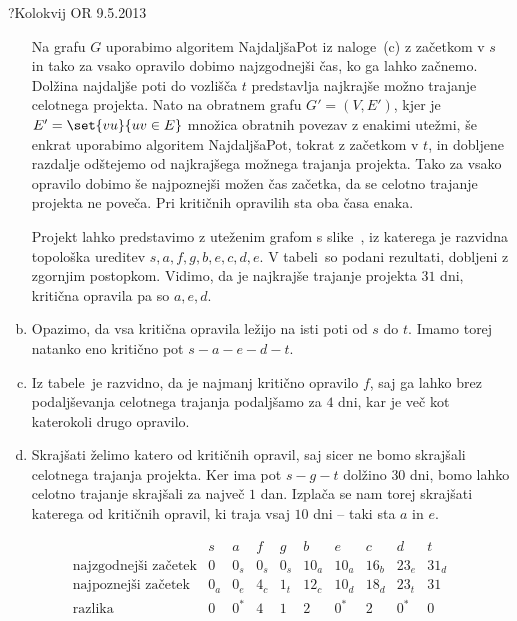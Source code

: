 \begin{naloga}{?}{Kolokvij OR 9.5.2013}
\begin{odgovor}
\begin{enumerate}[(a)]
Na grafu $G$ uporabimo algoritem {\sc NajdaljšaPot} iz naloge~\res[topo]{}(c)
z začetkom v $s$ in tako za vsako opravilo dobimo najzgodnejši čas,
ko ga lahko začnemo.
Dolžina najdaljše poti do vozlišča $t$
predstavlja najkrajše možno trajanje ce\-lot\-ne\-ga projekta.
Nato na obratnem grafu $G' = (V, E')$,
kjer je $E' = \set{vu}{uv \in E}$ množica obratnih povezav z enakimi utežmi,
še enkrat uporabimo algoritem {\sc NajdaljšaPot}, tokrat z začetkom v $t$,
in dobljene razdalje odštejemo od najkrajšega možnega trajanja projekta.
Tako za vsako opravilo dobimo še najpoznejši možen čas začetka,
da se celotno trajanje projekta ne poveča.
Pri kritičnih opravilih sta oba časa enaka.

Projekt lahko predstavimo z uteženim grafom s slike~\fig,
iz katerega je razvidna topološka ureditev $s, a, f, g, b, e, c, d, e$.
V tabeli~ so podani rezultati,
dobljeni z zgornjim postopkom.
Vidimo, da je najkrajše trajanje projekta $31$ dni,
kritična opravila pa so $a, e, d$.

\item Opazimo, da vsa kritična opravila ležijo na isti poti od $s$ do $t$.
Imamo torej natanko eno kritično pot $s - a - e - d - t$.

\item Iz tabele~ je razvidno,
da je najmanj kritično opravilo $f$,
saj ga lahko brez podaljševanja celotnega trajanja podaljšamo za $4$ dni,
kar je več kot katerokoli drugo opravilo.

\item Skrajšati želimo katero od kritičnih opravil,
saj sicer ne bomo skrajšali celotnega trajanja projekta.
Ker ima pot $s - g - t$ dolžino $30$ dni,
bomo lahko celotno trajanje skrajšali za največ $1$ dan.
Izplača se nam torej skrajšati katerega od kritičnih opravil,
ki traja vsaj $10$ dni -- taki sta $a$ in $e$.
\end{enumerate}
%
\begin{slika}
\pgfslika
{}
\end{slika}
%
\begin{tabela}
$$
\begin{array}{r|ccccccccc}
& s & a & f & g & b & e & c & d & t \\ \hline
\text{najzgodnejši začetek} &
0 & 0_s & 0_s & 0_s & 10_a & 10_a & 16_b & 23_e & 31_d \\
\text{najpoznejši začetek} &
0_a & 0_e & 4_c & 1_t & 12_c & 10_d & 18_d & 23_t & 31 \\
\text{razlika} &
0 & 0^* & 4 & 1 & 2 & 0^* & 2 & 0^* & 0
\end{array}
$$
\end{tabela}
\end{odgovor}
\end{naloga}
